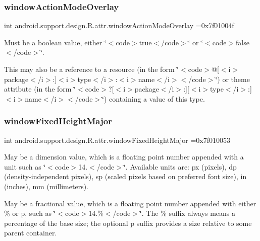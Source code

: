 \subsubsection{\texorpdfstring{window\+Action\+Mode\+Overlay}{windowActionModeOverlay}}
{\footnotesize\ttfamily int android.\+support.\+design.\+R.\+attr.\+window\+Action\+Mode\+Overlay =0x7f01004f\hspace{0.3cm}{\ttfamily [static]}}

Must be a boolean value, either \char`\"{}$<$code$>$true$<$/code$>$\char`\"{} or \char`\"{}$<$code$>$false$<$/code$>$\char`\"{}. 

This may also be a reference to a resource (in the form \char`\"{}$<$code$>$@\mbox{[}$<$i$>$package$<$/i$>$\+:\mbox{]}$<$i$>$type$<$/i$>$\+:$<$i$>$name$<$/i$>$$<$/code$>$\char`\"{}) or theme attribute (in the form \char`\"{}$<$code$>$?\mbox{[}$<$i$>$package$<$/i$>$\+:\mbox{]}\mbox{[}$<$i$>$type$<$/i$>$\+:\mbox{]}$<$i$>$name$<$/i$>$$<$/code$>$\char`\"{}) containing a value of this type. \mbox{\label{classandroid_1_1support_1_1design_1_1R_1_1attr_a7f3cc481bef4ffdd7d3986407ba955d9}} 
\subsubsection{\texorpdfstring{window\+Fixed\+Height\+Major}{windowFixedHeightMajor}}
{\footnotesize\ttfamily int android.\+support.\+design.\+R.\+attr.\+window\+Fixed\+Height\+Major =0x7f010053\hspace{0.3cm}{\ttfamily [static]}}

May be a dimension value, which is a floating point number appended with a unit such as \char`\"{}$<$code$>$14.\+5sp$<$/code$>$\char`\"{}. Available units are\+: px (pixels), dp (density-\/independent pixels), sp (scaled pixels based on preferred font size), in (inches), mm (millimeters). 

May be a fractional value, which is a floating point number appended with either \% or p, such as \char`\"{}$<$code$>$14.\%$<$/code$>$\char`\"{}. The \% suffix always means a percentage of the base size; the optional p suffix provides a size relative to some parent container. 

